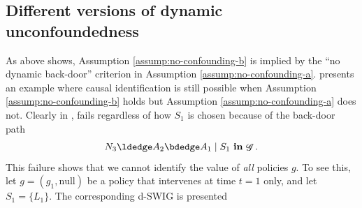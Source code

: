 \documentclass[12pt,a4paper]{article}
\theoremstyle{definition}
\newcommand{\PP}[0]{\mathbb{P}}
\newcommand{\ingraph}[1]{~\textnormal{\bf in}\,#1}
\DeclareMathOperator{\gG}{\mathscr{G}}
\begin{document}

\subsection{Different versions of dynamic
  unconfoundedness}\label{sec:remarks-dynam-unconf}
As  above shows, Assumption
\ref{assump:no-confounding-b} is implied by the ``no dynamic
back-door'' criterion in Assumption
\ref{assump:no-confounding-a}.  presents an
example where causal identification is still possible when Assumption
\ref{assump:no-confounding-b} holds but Assumption
\ref{assump:no-confounding-a} does not.
Clearly in ,
 fails regardless of how $S_1$ is chosen
because of the back-door path
\[
    N_3 \ldedge A_2 \bdedge A_1 \mid S_1 \ingraph{\gG}.
\]
This failure shows that we cannot
identify the value of \emph{all} policies $g$. To see this,
let $g = (g_1, \text{null})$ be a policy that intervenes at time $t=1$
only, and let $S_1 = \{L_1\}$. The corresponding d-SWIG is presented
\end{document}
